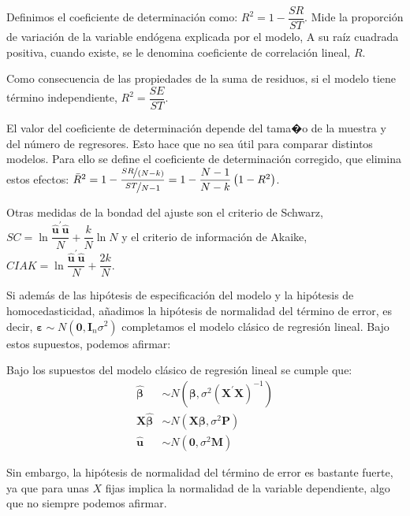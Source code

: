 
Definimos el coeficiente de determinaci\'on como: $R^{2}=1-\dfrac{SR}{ST}$.
Mide la proporci\'on de variaci\'on de la variable end\'ogena explicada
por el modelo, A su ra\'iz cuadrada positiva, cuando existe, se le denomina
coeficiente de correlaci\'on lineal, $R$.

Como consecuencia de las propiedades de la suma de residuos, si el
modelo tiene t\'ermino independiente, $R^{2}=\dfrac{SE}{ST}$.

El valor del coeficiente de determinaci\'on depende del tama�o de la
muestra y del n\'umero de regresores. Esto hace que no sea \'util para
comparar distintos modelos. Para ello se define el coeficiente de
determinaci\'on corregido, que elimina estos efectos: $\bar{R}^{2}=1-\dfrac{\nicefrac{SR}{\left(N-k\right)}}{\nicefrac{ST}{N-1}}=1-\dfrac{N-1}{N-k}\left(1-R^{2}\right)$.

Otras medidas de la bondad del ajuste son el criterio de Schwarz,
$SC=\ln{\dfrac{\hat{\boldsymbol{u}}^{\prime}\hat{\boldsymbol{u}}}{N}}+\dfrac{k}{N}\ln{N}$
y el criterio de informaci\'on de Akaike, $CIAK=\ln{\dfrac{\hat{\boldsymbol{u}}^{\prime}\hat{\boldsymbol{u}}}{N}}+\dfrac{2k}{N}$.




Si adem\'as de las hip\'otesis de especificaci\'on del modelo y la hip\'otesis de homocedasticidad, a\~nadimos la hip\'otesis de normalidad del t\'ermino de error, es decir, $\boldsymbol{\varepsilon}\sim N(\boldsymbol{0},\boldsymbol{I}_n\sigma^2)$ completamos el modelo cl\'asico de regresi\'on lineal. Bajo estos supuestos, podemos afirmar:
\begin{teorema}
Bajo los supuestos del modelo cl\'asico de regresi\'on lineal se cumple que:
\begin{align*}
\hat{\boldsymbol{\beta}}&\sim N(\boldsymbol{\beta}, \sigma^2\left(\boldsymbol{X}^{\prime}\boldsymbol{X}\right)^{-1}) \\
\boldsymbol{X}\hat{\boldsymbol{\beta}}&\sim N(\boldsymbol{X}\boldsymbol{\beta}, \sigma^2\boldsymbol{P}) \\
\hat{\boldsymbol{u}}&\sim N(\boldsymbol{0}, \sigma^2\boldsymbol{M}) 
\end{align*}
\end{teorema}

Sin embargo, la hip\'otesis de normalidad del t\'ermino de error es bastante fuerte, ya que para unas $X$ fijas implica la normalidad de la variable dependiente, algo que no siempre podemos afirmar.

